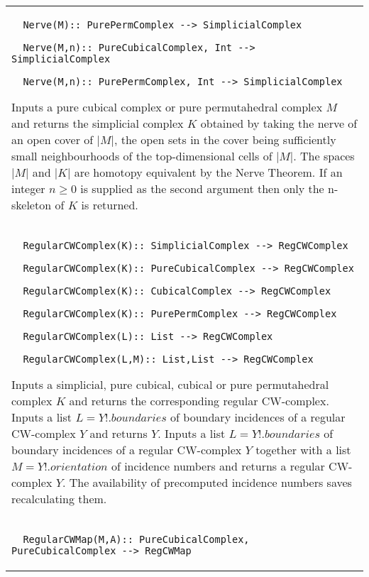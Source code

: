 \documentclass[a4paper,11pt]{report}
\begin{document}
{\begin{center}
\begin{tabular}{|l|}
\begin{verbatim}  Nerve(M):: PurePermComplex --> SimplicialComplex
\end{verbatim}
 
\begin{verbatim}  Nerve(M,n):: PureCubicalComplex, Int --> SimplicialComplex
\end{verbatim}
 
\begin{verbatim}  Nerve(M,n):: PurePermComplex, Int --> SimplicialComplex
\end{verbatim}


 

Inputs a pure cubical complex or pure permutahedral complex $M$ and returns the simplicial complex $K$ obtained by taking the nerve of an open cover of $|M|$, the open sets in the cover being sufficiently small neighbourhoods of the
top-dimensional cells of $|M|$. The spaces $|M|$ and $|K|$ are homotopy equivalent by the Nerve Theorem. If an integer $n \ge 0$ is supplied as the second argument then only the n-skeleton of $K$ is returned. \\
 \index{RegularCWComplex} 
\begin{verbatim}  RegularCWComplex(K):: SimplicialComplex --> RegCWComplex
\end{verbatim}
 
\begin{verbatim}  RegularCWComplex(K):: PureCubicalComplex --> RegCWComplex
\end{verbatim}
 
\begin{verbatim}  RegularCWComplex(K):: CubicalComplex --> RegCWComplex
\end{verbatim}
 
\begin{verbatim}  RegularCWComplex(K):: PurePermComplex --> RegCWComplex
\end{verbatim}
 
\begin{verbatim}  RegularCWComplex(L):: List --> RegCWComplex
\end{verbatim}
 
\begin{verbatim}  RegularCWComplex(L,M):: List,List --> RegCWComplex
\end{verbatim}


 

Inputs a simplicial, pure cubical, cubical or pure permutahedral complex $K$ and returns the corresponding regular CW-complex. Inputs a list $L=Y!.boundaries$ of boundary incidences of a regular CW-complex $Y$ and returns $Y$. Inputs a list $L=Y!.boundaries$ of boundary incidences of a regular CW-complex $Y$ together with a list $M=Y!.orientation$ of incidence numbers and returns a regular CW-complex $Y$. The availability of precomputed incidence numbers saves recalculating them. \\
 \index{RegularCWMap} 
\begin{verbatim}  RegularCWMap(M,A):: PureCubicalComplex, PureCubicalComplex --> RegCWMap
\end{verbatim}



\end{tabular}
\end{center}}
\end{document}

